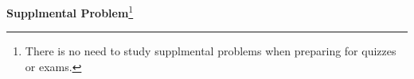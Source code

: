 \documentclass[handout]{mcs}
\begin{document}




\begin{center}
\textbf{Supplmental Problem}\footnote{There is no need to study supplmental
  problems when preparing for quizzes or exams.}
\end{center}


\iffalse
\pinput{PS_predicate_calculus_power_of_two}
\pinput{PS_6042_staff_cabal}
\pinput{FP_logic_of_leq}
\pinput{CP_logic_news_network}  %
\pinput{PS_emailed_exactly_2_others}  %
\pinput{PS_express_in_predicate_form}
\pinput{PS_express_predicates_in_formal_logic_notation}
\pinput{PS_predicate_calculus_power_of_prime}  %
\pinput{PS_predicate_calculus_power_of_two}
\pinput{PS_rewrite_assertions_prime_goldbach_bertrand_fermat}
\pinput{PS_translate_sentence_into_predicate_formula}
\pinput{PS_translate_to_predicate_logic}
\pinput{CP_a_season_for_every_purpose}
\fi

\end{document}
